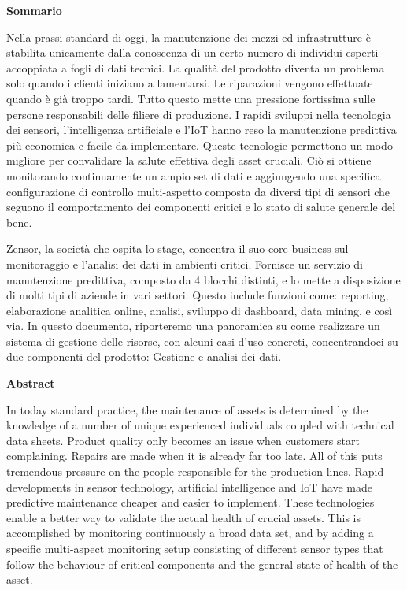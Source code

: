 \begin{center}
    \textbf{Sommario}
\end{center}
Nella prassi standard di oggi, la manutenzione dei mezzi ed infrastrutture è stabilita unicamente dalla conoscenza di un certo numero di individui esperti accoppiata a fogli di dati tecnici.
La qualità del prodotto diventa un problema solo quando i clienti iniziano a lamentarsi. Le riparazioni vengono effettuate quando è già troppo tardi. Tutto questo mette una pressione fortissima sulle persone responsabili delle filiere di produzione. I rapidi sviluppi nella tecnologia dei sensori, l'intelligenza artificiale e l'IoT hanno reso la manutenzione predittiva più economica e facile da implementare. Queste tecnologie permettono un modo migliore per convalidare la salute effettiva degli asset cruciali. Ciò si ottiene monitorando continuamente un ampio set di dati e aggiungendo una specifica configurazione di controllo multi-aspetto composta da diversi tipi di sensori che seguono il comportamento dei componenti critici e lo stato di salute generale del bene.

Zensor, la società che ospita lo stage, concentra il suo core business sul monitoraggio e l'analisi dei dati in ambienti critici. Fornisce un servizio di manutenzione predittiva, composto da 4 blocchi distinti, e lo mette a disposizione di molti tipi di aziende in vari settori.  Questo include funzioni come: reporting, elaborazione analitica online, analisi, sviluppo di dashboard, data mining, e così via.
In questo documento, riporteremo una panoramica su come realizzare un sistema di gestione delle risorse, con alcuni casi d'uso concreti, concentrandoci su due componenti del prodotto: Gestione e analisi dei dati.
\cleardoublepage

\begin{center}
    \textbf{Abstract}
\end{center}

In today standard practice, the maintenance of assets is determined by the knowledge of a number of unique experienced individuals coupled with technical data sheets.
Product quality only becomes an issue when customers start complaining. Repairs are made when it is already far too late. All of this puts tremendous pressure on the people responsible for the production lines. Rapid developments in sensor technology, artificial intelligence and IoT have made predictive maintenance cheaper and easier to implement. These technologies enable a better way to validate the actual health of crucial assets. This is accomplished by monitoring continuously a broad data set, and by adding a specific multi-aspect monitoring setup consisting of different sensor types that follow the behaviour of critical components and the general state-of-health of the asset.

